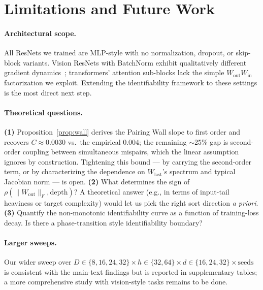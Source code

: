 \documentclass[10pt]{article}
\theoremstyle{remark}
\begin{document}
\section{Limitations and Future Work}

\paragraph{Architectural scope.} All ResNets we trained are MLP-style
with no normalization, dropout, or skip-block variants. Vision ResNets
with BatchNorm exhibit qualitatively different gradient
dynamics~\cite{santurkar2018bn}; transformers' attention sub-blocks
lack the simple $W_{\mathrm{out}} W_{\mathrm{in}}$ factorization we
exploit. Extending the identifiability framework to these settings is
the most direct next step.

\paragraph{Theoretical questions.}
\textbf{(1)} Proposition~\ref{prop:wall} derives the Pairing Wall slope
to first order and recovers $C\approx 0.0030$ vs.\ the empirical $0.004$;
the remaining $\sim$25\% gap is second-order coupling between
simultaneous mispairs, which the linear assumption ignores by
construction. Tightening this bound --- by carrying the second-order
term, or by characterizing the dependence on
$W_{\mathrm{last}}$'s spectrum and typical Jacobian norm --- is open.
\textbf{(2)} What determines the sign of $\rho(\|W_{\mathrm{out}}\|_F, \text{depth})$?
A theoretical answer (e.g., in terms of input-tail heaviness or target
complexity) would let us pick the right sort direction \emph{a priori}.
\textbf{(3)} Quantify the non-monotonic identifiability curve as a
function of training-loss decay. Is there a phase-transition style
identifiability boundary?

\paragraph{Larger sweeps.} Our wider sweep over
$D \in \{8,16,24,32\}\times h \in \{32, 64\}\times d \in \{16,24,32\}\times \text{seeds}$
is consistent with the main-text findings but is reported in
supplementary tables; a more comprehensive study with vision-style
tasks remains to be done.
\end{document}
